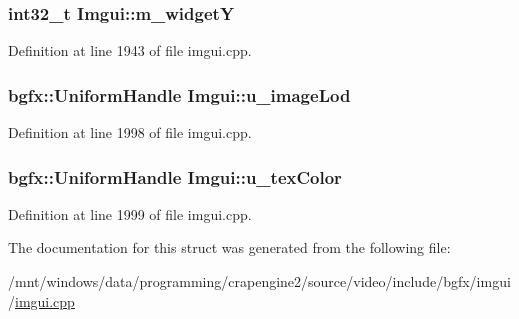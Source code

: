 \hypertarget{struct_imgui_a042e283b16ddcc06e5d8070885aa8bd6}{
\subsubsection[{m\+\_\+widget\+Y}]{\setlength{\rightskip}{0pt plus 5cm}int32\+\_\+t Imgui\+::m\+\_\+widget\+Y}}\label{struct_imgui_a042e283b16ddcc06e5d8070885aa8bd6}


Definition at line 1943 of file imgui.\+cpp.

\hypertarget{struct_imgui_a30263cbb0979de658a5075d42f6194c3}{
\subsubsection[{u\+\_\+image\+Lod}]{\setlength{\rightskip}{0pt plus 5cm}bgfx\+::\+Uniform\+Handle Imgui\+::u\+\_\+image\+Lod}}\label{struct_imgui_a30263cbb0979de658a5075d42f6194c3}


Definition at line 1998 of file imgui.\+cpp.

\hypertarget{struct_imgui_afa78c96bf20f3b39f798596df31b1064}{
\subsubsection[{u\+\_\+tex\+Color}]{\setlength{\rightskip}{0pt plus 5cm}bgfx\+::\+Uniform\+Handle Imgui\+::u\+\_\+tex\+Color}}\label{struct_imgui_afa78c96bf20f3b39f798596df31b1064}


Definition at line 1999 of file imgui.\+cpp.



The documentation for this struct was generated from the following file\+:\begin{DoxyCompactItemize}
\item 
/mnt/windows/data/programming/crapengine2/source/video/include/bgfx/imgui/\hyperlink{imgui_8cpp}{imgui.\+cpp}\end{DoxyCompactItemize}
